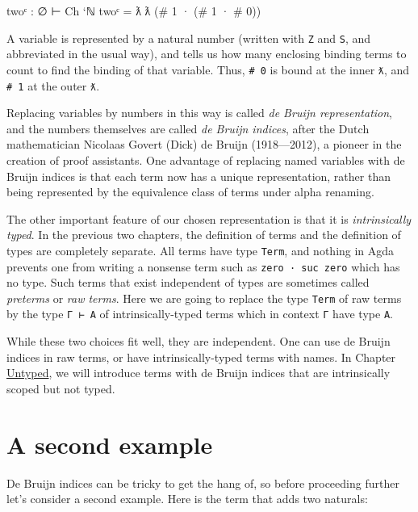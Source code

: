\begin{myDisplay}
twoᶜ  :  ∅ ⊢ Ch `ℕ
twoᶜ  =  ƛ ƛ (# 1 · (# 1 · # 0))
\end{myDisplay}

A variable is represented by a natural number (written with \texttt{Z}
and \texttt{S}, and abbreviated in the usual way), and tells us how many
enclosing binding terms to count to find the binding of that variable.
Thus, \texttt{\#\ 0} is bound at the inner \texttt{ƛ}, and
\texttt{\#\ 1} at the outer \texttt{ƛ}.

Replacing variables by numbers in this way is called \emph{de Bruijn
representation}, and the numbers themselves are called \emph{de Bruijn
indices}, after the Dutch mathematician Nicolaas Govert (Dick) de Bruijn
(1918---2012), a pioneer in the creation of proof assistants. One
advantage of replacing named variables with de Bruijn indices is that
each term now has a unique representation, rather than being represented
by the equivalence class of terms under alpha renaming.

The other important feature of our chosen representation is that it is
\emph{intrinsically typed}. In the previous two chapters, the definition
of terms and the definition of types are completely separate. All terms
have type \texttt{Term}, and nothing in Agda prevents one from writing a
nonsense term such as
\texttt{\textasciigrave{}zero\ ·\ \textasciigrave{}suc\ \textasciigrave{}zero}
which has no type. Such terms that exist independent of types are
sometimes called \emph{preterms} or \emph{raw terms}. Here we are going
to replace the type \texttt{Term} of raw terms by the type
\texttt{Γ\ ⊢\ A} of intrinsically-typed terms which in context
\texttt{Γ} have type \texttt{A}.

While these two choices fit well, they are independent. One can use de
Bruijn indices in raw terms, or have intrinsically-typed terms with
names. In Chapter \protect\hyperlink{Untyped}{Untyped}, we will
introduce terms with de Bruijn indices that are intrinsically scoped but
not typed.

\hypertarget{a-second-example}{%
\section{A second example}\label{a-second-example}}

De Bruijn indices can be tricky to get the hang of, so before proceeding
further let's consider a second example. Here is the term that adds two
naturals:

